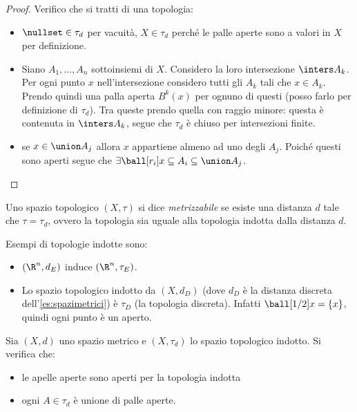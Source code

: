\begin{proof}
Verifico che si tratti di una topologia:
\begin{itemize}
\item $\nullset \in \tau_d$ per vacuità, $X \in \tau_d$ perché le palle aperte sono a valori in $X$ per definizione.
\item Siano $A_1,\ldots,A_n$ sottoinsiemi di $X$. Considero la loro intersezione $\inters A_k$. Per ogni punto $x$ nell'intersezione considero tutti gli $A_k$ tali che $x \in A_k$. Prendo quindi una palla aperta $B^k(x)$ per ognuno di questi (posso farlo per definizione di $\tau_d$).
Tra queste prendo quella con raggio minore: questa è contenuta in $\inters A_k$, segue che $\tau_d$ è chiuso per intersezioni finite.
\item se $x \in \union A_j$ allora $x$ appartiene almeno ad uno degli $A_j$. Poiché questi sono aperti segue che  $\exists \ball[r_i]x \subseteq A_i \subseteq \union A_j$. \qedhere
\end{itemize}
\end{proof}

\begin{defn}
Uno spazio topologico $(X,\tau)$ si dice \emph{metrizzabile} se esiste una distanza $d$ tale che $\tau=\tau_d$, ovvero la topologia sia uguale alla topologia indotta dalla distanza $d$.
\end{defn}

\begin{es}
Esempi di topologie indotte sono:
\begin{itemize}
\item $(\R^n,d_E)$  induce $(\R^n,\tau_E)$.
\item Lo spazio topologico indotto da $(X,d_D)$ (dove $d_D$ è la distanza discreta dell'\autoref{es:spazimetrici}) è $\tau_D$ (la topologia discreta). Infatti $\ball[1/2]x = \{x\}$, quindi ogni punto è un aperto.
\end{itemize}
\end{es}

\begin{prop}
Sia $(X,d)$ uno spazio metrico e $(X,\tau_d)$ lo spazio topologico indotto. Si  verifica che:
\begin{itemize}
\item le apelle aperte sono aperti per la topologia indotta
\item ogni $A \in \tau_d$ è unione di palle aperte.
\end{itemize}
\end{prop}

